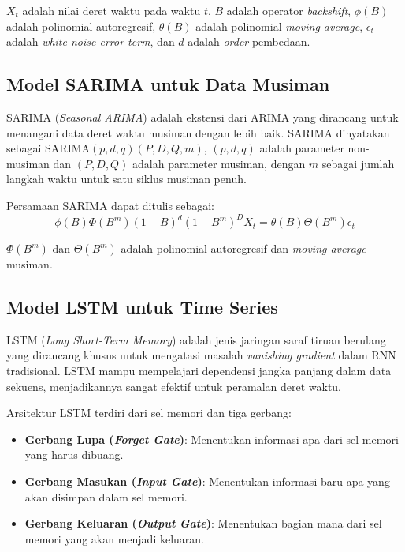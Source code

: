 $X_t$ adalah nilai deret waktu pada waktu $t$, $B$ adalah operator \textit{backshift}, $\phi(B)$ adalah polinomial autoregresif, $\theta(B)$ adalah polinomial \textit{moving average}, $\epsilon_t$ adalah \textit{white noise error term}, dan $d$ adalah \textit{order} pembedaan.

\subsection{Model SARIMA untuk Data Musiman}

SARIMA (\textit{Seasonal ARIMA}) adalah ekstensi dari ARIMA yang dirancang untuk menangani data deret waktu musiman dengan lebih baik. SARIMA dinyatakan sebagai SARIMA$(p, d, q)(P, D, Q, m)$, $(p, d, q)$ adalah parameter non-musiman dan $(P, D, Q)$ adalah parameter musiman, dengan $m$ sebagai jumlah langkah waktu untuk satu siklus musiman penuh.

Persamaan SARIMA dapat ditulis sebagai:
\begin{equation}
\phi(B)\Phi(B^m)(1-B)^d(1-B^m)^D X_t = \theta(B)\Theta(B^m) \epsilon_t
\end{equation}

$\Phi(B^m)$ dan $\Theta(B^m)$ adalah polinomial autoregresif dan \textit{moving average} musiman.

\subsection{Model LSTM untuk Time Series}

LSTM (\textit{Long Short-Term Memory}) adalah jenis jaringan saraf tiruan berulang yang dirancang khusus untuk mengatasi masalah \textit{vanishing gradient} dalam RNN tradisional. LSTM mampu mempelajari dependensi jangka panjang dalam data sekuens, menjadikannya sangat efektif untuk peramalan deret waktu.

Arsitektur LSTM terdiri dari sel memori dan tiga gerbang:
\begin{itemize}
\item \textbf{Gerbang Lupa (\textit{Forget Gate})}: Menentukan informasi apa dari sel memori yang harus dibuang.
\item \textbf{Gerbang Masukan (\textit{Input Gate})}: Menentukan informasi baru apa yang akan disimpan dalam sel memori.
\item \textbf{Gerbang Keluaran (\textit{Output Gate})}: Menentukan bagian mana dari sel memori yang akan menjadi keluaran.
\end{itemize}

